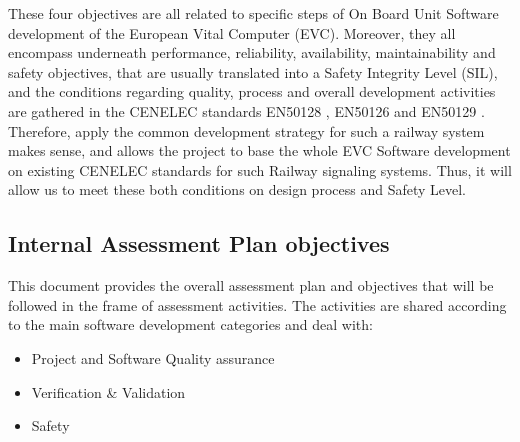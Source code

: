 \documentclass[openetcs]{template/openetcs_article}
\begin{document}
These four objectives are all related to specific steps of On Board Unit Software development of the European Vital Computer (EVC). Moreover, they all encompass
underneath performance, reliability, availability, maintainability and safety objectives, that are usually translated into a Safety Integrity Level (SIL), and
the conditions regarding quality, process and overall development activities are gathered in the CENELEC standards EN50128 \cite{EN50128}, EN50126
\cite{EN50126} and EN50129 \cite{EN50129}.
Therefore, apply the common development strategy for such a railway system makes sense, and allows the project to base the whole EVC Software development on
existing CENELEC standards for such Railway signaling systems. Thus, it will allow us to meet these both conditions on design process and Safety Level.

\subsection{Internal Assessment Plan objectives}
This document provides the overall assessment plan and objectives that will be followed in the frame of assessment activities.
The activities are shared according to the main software development categories and deal with:
\begin{itemize}
\item Project and Software Quality assurance
\item Verification \& Validation
\item Safety
\end{itemize}
\end{document}
